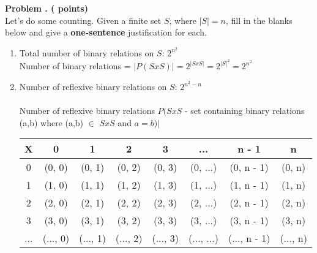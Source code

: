 
\newpage
\addtocounter{problemctr}{1}

{\bf
Problem \theproblemctr.  (\therelation\xspace points)}
\\

Let's do some counting. Given a finite set $S$, where $\lvert S \rvert= n$, fill in the blanks below and give a {\bf one-sentence} justification for each.

\vspace{.2in}

\begin{enumerate}[label=(\arabic*),itemsep=.3in]
\item
Total number of binary relations on $S$: $2^{n^2}$ \\
Number of binary relations = $|P(S x S)| = 2^{|SxS|} = 2^{|S|^2} = 2^{n^2}$
\item
Number of reflexive binary relations on $S$: $2^{n^2-n}$ \\\\
Number of reflexive binary relations $P (SxS$ - set containing binary relations (a,b) where (a,b) $\in$ $SxS$ and $a=b)|$  \\
\begin{tabular}{|c |c c c c c c c|} 
 		\hline
 		X & 0 & 1 & 2 & 3 &... & n - 1 & n\\ [0.5ex] 
 		\hline
 		0 & (0, 0) &  \cellcolor{red!25}(0, 1) &  \cellcolor{red!25}(0, 2) &  \cellcolor{red!25}(0, 3) &  \cellcolor{red!25}(0, ...) &  \cellcolor{red!25}(0, n - 1) &  \cellcolor{red!25}(0, n)\\ 
 		\hline
		1 & \cellcolor{red!25}(1, 0) & (1, 1) &  \cellcolor{red!25}(1, 2) &  \cellcolor{red!25}(1, 3) &  \cellcolor{red!25}(1, ...) &  \cellcolor{red!25}(1, n - 1) &  \cellcolor{red!25}(1, n)\\ 
 		\hline
		2 & \cellcolor{red!25}(2, 0) & \cellcolor{red!25}(2, 1) & (2, 2) &  \cellcolor{red!25}(2, 3) &  \cellcolor{red!25}(2, ...) &  \cellcolor{red!25}(2, n - 1) &  \cellcolor{red!25}(2, n)\\ 
 		\hline
		3 & \cellcolor{red!25}(3, 0) & \cellcolor{red!25}(3, 1) & \cellcolor{red!25}(3, 2) & (3, 3) &  \cellcolor{red!25}(3, ...) &  \cellcolor{red!25}(3, n - 1) &  \cellcolor{red!25}(3, n)\\ 
 		\hline
		... & \cellcolor{red!25}(..., 0) & \cellcolor{red!25}(..., 1) & \cellcolor{red!25}(..., 2) & \cellcolor{red!25}(..., 3) & (..., ...) &  \cellcolor{red!25}(..., n - 1) &  \cellcolor{red!25}(..., n)\\ 

\end{tabular}
\end{enumerate}
